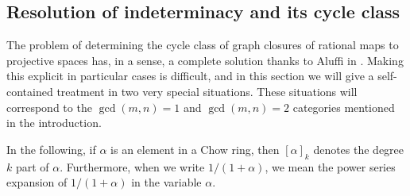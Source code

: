 \documentclass[12pt]{article}
\theoremstyle{plain}
\theoremstyle{remark}
\begin{document}
    \subsection{Resolution of indeterminacy and its cycle class}

    The problem of determining the cycle class of graph closures of rational maps to projective spaces has, in a sense, a complete solution thanks to Aluffi in \cite{aluffi2015multidegrees}.  Making this explicit in particular cases is difficult, and in this section we will give a self-contained treatment in two very special situations.  These situations will correspond to the $\gcd(m,n) = 1$ and $\gcd(m,n) = 2$ categories mentioned in the introduction.

    In the following, if $\alpha$ is an element in a Chow ring, then $[\alpha]_{k}$ denotes the degree $k$ part of $\alpha$.  Furthermore, when we write $1/(1+\alpha)$, we mean the power series expansion of $1/(1+\alpha)$ in the variable $\alpha$.
\end{document}
